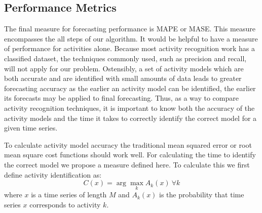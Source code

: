 

\subsection{Performance Metrics}
The final measure for forecasting performance is MAPE or MASE.  This measure encompasses the all steps of our algorithm.  It would be helpful to have a measure of performance for activities alone.  Because most activity recognition work has a classified dataset, the techniques commonly used, such as precision and recall, will not apply for our problem.  Ostensibly, a set of activity models which are both accurate and are identified with small amounts of data leads to greater forecasting accuracy as the earlier an activity model can be identified, the earlier its forecasts may be applied to final forecasting.  Thus, as a way to compare activity recognition techniques, it is important to know both the accuracy of the activity models and the time it takes to correctly identify the correct model for a given time series.

To calculate activity model accuracy the traditional mean squared error or root mean square cost functions should work well.  For calculating the time to identify the correct model we propose a measure defined here.  To calculate this we first define activity identification as:
\begin{equation}
\label{eq:activity_identification}
C(x) = \arg\max_{k} A_{k}(x) \ \forall k
\end{equation}
\noindent
where $x$ is a time series of length $M$ and $A_{k}(x)$ is the probability that time series $x$ corresponds to activity $k$.

